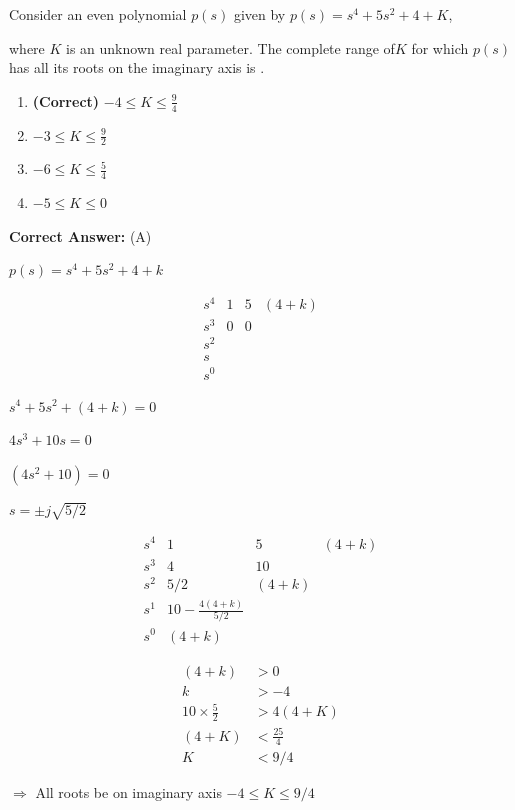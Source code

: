 \documentclass[11pt,a4paper]{article}
\begin{document}
\noindent Consider an even polynomial $p(s)$ given by
 $p(s)=s^4+5s^2+4+K$,

where $K$ is an unknown real parameter. The complete range of$K$ for which $p(s)$ has
all its roots on the imaginary axis is \underline{\hspace{1.5cm}}.


\begin{enumerate}[label=(\Alph*)]
    \item \textbf{(Correct)} $-4\leq K\leq \frac{9}{4}$
    \item $-3\leq K\leq \frac{9}{2}$
    \item $-6\leq K\leq \frac{5}{4}$
    \item $-5\leq K\leq 0$
\end{enumerate}

\noindent \textbf{Correct Answer:} (A)

\begin{tcolorbox}[solbox, title=Detailed Solution -- Question 22]
$p(s)=s^4+5s^2+4+k$

\[
\begin{matrix}
s^4 &  1& 5 &(4+k) \\
s^3& 0 & 0 & \\
s^2&  &  & \\
s&  &  & \\
s^0&  &  &
\end{matrix}
\]

$s^4+5s^2+(4+k)=0$

$4s^3+10s=0$

$(4s^2+10)=0$

$s=\pm j\sqrt{5/2}$

\[
\begin{matrix}
s^4 &  1& 5 &(4+k) \\
s^3& 4 & 10 & \\
s^2& 5/2 & (4+k) & \\
s^1&10-\frac{4(4+k)}{5/2}  &  & \\
s^0& (4+k) &  &
\end{matrix}
\]

\[
\begin{aligned}
(4+k) & > 0\\
k & > -4\\
10 \times \frac{5}{2}& > 4(4+K)\\
(4+K)& < \frac{25}{4}\\
K& < 9/4
\end{aligned}
\]

$\Rightarrow$  All roots be on imaginary axis
$-4\leq K\leqslant 9/4$
\end{tcolorbox}
\end{document}

